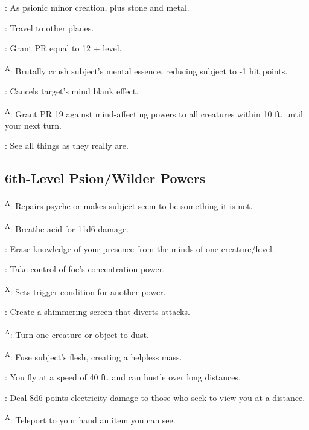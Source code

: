 : As psionic minor creation, plus stone and metal.

: Travel to other planes.

: Grant PR equal to 12 + level.

\textsuperscript{A}: Brutally crush subject's mental essence, reducing subject to -1 hit points.

: Cancels target's mind blank effect.

\textsuperscript{A}: Grant PR 19 against mind-affecting powers to all creatures within 10 ft. until your next turn.

: See all things as they really are.




\subsection{6th-Level Psion/Wilder Powers}

\textsuperscript{A}: Repairs psyche or makes subject seem to be something it is not.

\textsuperscript{A}: Breathe acid for 11d6 damage.

: Erase knowledge of your presence from the minds of one creature/level.

: Take control of foe's concentration power.

\textsuperscript{X}: Sets trigger condition for another power.

: Create a shimmering screen that diverts attacks.

\textsuperscript{A}: Turn one creature or object to dust.

\textsuperscript{A}: Fuse subject's flesh, creating a helpless mass.

: You fly at a speed of 40 ft. and can hustle over long distances.

: Deal 8d6 points electricity damage to those who seek to view you at a distance.

\textsuperscript{A}: Teleport to your hand an item you can see.

